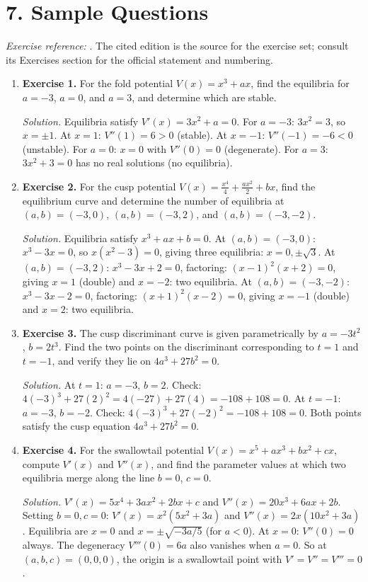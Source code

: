 \section*{7. Sample Questions}
\emph{Exercise reference:} \cite{catastrophe_theory_ref1}. The cited edition is the source for the exercise set; consult its Exercises section for the official statement and numbering.
\begin{enumerate}[leftmargin=*,itemsep=0.9em]

\item \textbf{Exercise 1.} For the fold potential $V(x)=x^3+ax$, find the equilibria for $a=-3$, $a=0$, and $a=3$, and determine which are stable.

\emph{Solution.} Equilibria satisfy $V'(x)=3x^2+a=0$. For $a=-3$: $3x^2=3$, so $x=\pm 1$. At $x=1$: $V''(1)=6>0$ (stable). At $x=-1$: $V''(-1)=-6<0$ (unstable). For $a=0$: $x=0$ with $V''(0)=0$ (degenerate). For $a=3$: $3x^2+3=0$ has no real solutions (no equilibria).

\item \textbf{Exercise 2.} For the cusp potential $V(x)=\frac{x^4}{4}+\frac{ax^2}{2}+bx$, find the equilibrium curve and determine the number of equilibria at $(a,b)=(-3,0)$, $(a,b)=(-3,2)$, and $(a,b)=(-3,-2)$.

\emph{Solution.} Equilibria satisfy $x^3+ax+b=0$. At $(a,b)=(-3,0)$: $x^3-3x=0$, so $x(x^2-3)=0$, giving three equilibria: $x=0,\pm\sqrt{3}$. At $(a,b)=(-3,2)$: $x^3-3x+2=0$, factoring: $(x-1)^2(x+2)=0$, giving $x=1$ (double) and $x=-2$: two equilibria. At $(a,b)=(-3,-2)$: $x^3-3x-2=0$, factoring: $(x+1)^2(x-2)=0$, giving $x=-1$ (double) and $x=2$: two equilibria.

\item \textbf{Exercise 3.} The cusp discriminant curve is given parametrically by $a=-3t^2$, $b=2t^3$. Find the two points on the discriminant corresponding to $t=1$ and $t=-1$, and verify they lie on $4a^3+27b^2=0$.

\emph{Solution.} At $t=1$: $a=-3$, $b=2$. Check: $4(-3)^3+27(2)^2=4(-27)+27(4)=-108+108=0$. At $t=-1$: $a=-3$, $b=-2$. Check: $4(-3)^3+27(-2)^2=-108+108=0$. Both points satisfy the cusp equation $4a^3+27b^2=0$.

\item \textbf{Exercise 4.} For the swallowtail potential $V(x)=x^5+ax^3+bx^2+cx$, compute $V'(x)$ and $V''(x)$, and find the parameter values at which two equilibria merge along the line $b=0$, $c=0$.

\emph{Solution.} $V'(x)=5x^4+3ax^2+2bx+c$ and $V''(x)=20x^3+6ax+2b$. Setting $b=0,c=0$: $V'(x)=x^2(5x^2+3a)$ and $V''(x)=2x(10x^2+3a)$. Equilibria are $x=0$ and $x=\pm\sqrt{-3a/5}$ (for $a<0$). At $x=0$: $V''(0)=0$ always. The degeneracy $V'''(0)=6a$ also vanishes when $a=0$. So at $(a,b,c)=(0,0,0)$, the origin is a swallowtail point with $V'=V''=V'''=0$.


\end{enumerate}
